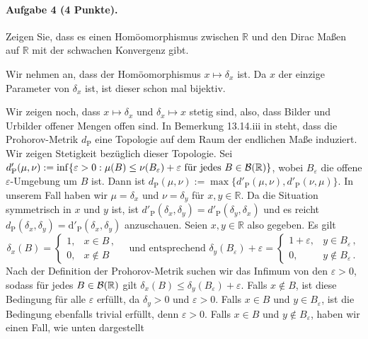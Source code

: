 \documentclass{article}
\begin{document}
\paragraph{Aufgabe 4 \textnormal{(4 Punkte)}.}
Zeigen Sie, dass es einen Homöomorphismus zwischen $\mathbb{R}$ und den Dirac Maßen auf $\mathbb{R}$ mit der schwachen Konvergenz gibt.

Wir nehmen an, dass der Homöomorphismus $x\mapsto\delta_x$ ist.
Da $x$ der einzige Parameter von $\delta_x$ ist, ist dieser schon mal bijektiv.

Wir zeigen noch, dass $x\mapsto\delta_x$ und $\delta_x\mapsto x$ stetig sind, also, dass Bilder und Urbilder offener Mengen offen sind.
In Bemerkung 13.14.iii in \cite{klenke} steht, dass die Prohorov-Metrik $d_\mathrm{P}$ eine Topologie auf dem Raum der endlichen Maße induziert.
Wir zeigen Stetigkeit bezüglich dieser Topologie.
Sei $d'_\mathrm{P}(\mu,\nu):=\inf\{\varepsilon>0:\mu(B)\leq\nu(B_\varepsilon)+\varepsilon\text{ für jedes }B\in{\cal B}(\mathbb{R})\}$, wobei $B_\varepsilon$ die offene $\varepsilon$-Umgebung um $B$ ist.
Dann ist $d_\mathrm{P}(\mu,\nu):=\max\{d'_\mathrm{P}(\mu,\nu),d'_\mathrm{P}(\nu,\mu)\}$.
In unserem Fall haben wir $\mu=\delta_x$ und $\nu=\delta_y$ für $x,y\in\mathbb{R}$.
Da die Situation symmetrisch in $x$ und $y$ ist, ist $d'_\mathrm{P}(\delta_x,\delta_y)=d'_\mathrm{P}(\delta_y,\delta_x)$ und es reicht $d_\mathrm{P}(\delta_x,\delta_y)=\mathrm{d}'_\mathrm{P}(\delta_x,\delta_y)$ anzuschauen.
Seien $x,y\in\mathbb{R}$ also gegeben.
Es gilt
\[
\delta_x(B)=
\begin{cases}
  1,&x\in B\,,\\
  0,&x\notin B
\end{cases}
\quad\text{und entsprechend }
\delta_y(B_\varepsilon)+\varepsilon=
\begin{cases}
  1+\varepsilon,&y\in B_\varepsilon\,,\\
  0,&y\notin B_\varepsilon\,.
\end{cases}
\]
Nach der Definition der Prohorov-Metrik suchen wir das Infimum von den $\varepsilon>0$, sodass für jedes $B\in {\cal B}(\mathbb{R})$ gilt $\delta_x(B)\leq\delta_y(B_\varepsilon)+\varepsilon$.
Falls $x\notin B$, ist diese Bedingung für alle $\varepsilon$ erfüllt, da $\delta_y>0$ und $\varepsilon>0$.
Falls $x\in B$ und $y\in B_\varepsilon$, ist die Bedingung ebenfalls trivial erfüllt, denn $\varepsilon>0$.
Falls $x\in B$ und $y\notin B_\varepsilon$, haben wir einen Fall, wie unten dargestellt
\begin{center}
\end{center}
\end{document}
